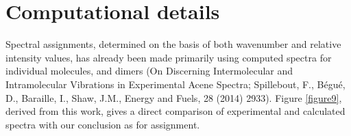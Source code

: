 \section{Computational details}


Spectral assignments, determined on the basis of both wavenumber and relative intensity values, has already been made primarily using computed spectra for individual molecules, and dimers (On Discerning Intermolecular and Intramolecular Vibrations in Experimental Acene Spectra; Spillebout, F., Bégué, D., Baraille, I., Shaw, J.M., Energy and Fuels, 28 (2014) 2933).
Figure \ref{figure9}, derived from this work, gives a direct comparison of experimental and calculated spectra with our conclusion as for assignment.


